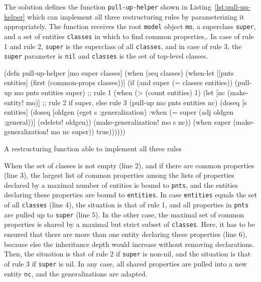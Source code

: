 \documentclass[submission]{eptcs}
\begin{document}
The solution defines the function \verb|pull-up-helper| shown in
Listing~\ref{lst:pull-up-helper} which can implement all three restructuring
rules by parameterizing it appropriately.  The function receives the root
\verb|model| object \verb|mo|, a superclass \verb|super|, and a set of entities
\verb|classes| in which to find common properties,.  In case of rule 1 and rule
2, \verb|super| is the superclass of all \verb|classes|, and in case of rule 3,
the \verb|super| parameter is \verb|nil| and \verb|classes| is the set of
top-level classes.

\begin{listing}[htbp]
  \begin{clojurecode}
(defn pull-up-helper [mo super classes]
  (when (seq classes)
    (when-let [[pnts entities] (first (common-props classes))]
      (if (and super (= classes entities))
        (pull-up mo pnts entities super)  ;; rule 1
        (when (> (count entities) 1)
          (let [nc (make-entity! mo)]     ;; rule 2 if super, else rule 3
            (pull-up mo pnts entities nc)
            (doseq [s entities]
              (doseq [oldgen (eget s :generalization)
                      :when (= super (adj oldgen :general))]
                (edelete! oldgen))
              (make-generalization! mo s nc))
            (when super (make-generalization! mo nc super))
            true))))))
  \end{clojurecode}
  \caption{A restructuring function able to implement all three rules}
  \label{lst:pull-up-helper}
\end{listing}

When the set of classes is not empty (line 2), and if there are common
properties (line 3), the largest list of common properties among the lists of
properties declared by a maximal number of entities is bound to \verb|pnts|,
and the entities declaring these properties are bound to \verb|entities|.  In
case \verb|entities| equals the set of all \verb|classes| (line 4), the
situation is that of rule 1, and all properties in \verb|pnts| are pulled up to
\verb|super| (line 5).  In the other case, the maximal set of common properties
is shared by a maximal but strict subset of \verb|classes|.  Here, it has to be
ensured that there are more than one entity declaring these properties (line
6), because else the inheritance depth would increase without removing
declarations.  Then, the situation is that of rule 2 if \verb|super| is
non-nil, and the situation is that of rule 3 if \verb|super| is nil.  In any
case, all shared properties are pulled into a new entity \verb|nc|, and the
generalizations are adapted.
\end{document}
